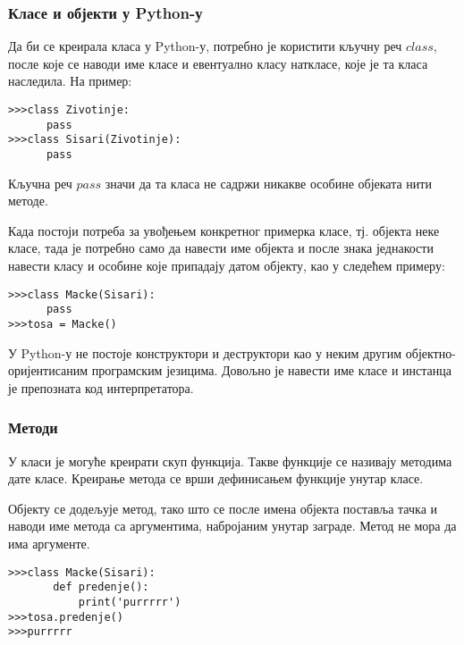 \subsubsection{Класе и објекти у Python-у}

Да би се креирала класа у Python-у, потребно је користити кључну реч $class$, после које се наводи име класе и евентуално класу наткласе, које је та класа наследила. На пример:

\begin{lstlisting}[caption=Дефинисање класа, label=class]
>>>class Zivotinje:
      pass
>>>class Sisari(Zivotinje):
      pass
\end{lstlisting}

Кључна реч $pass$ значи да та класа не садржи никакве особине објеката нити методе.

Када постоји потреба за увођењем конкретног примерка класе, тј. објекта неке класе, тада је потребно само да навести име објекта и после знака једнакости навести класу и особине које припадају датом објекту, као у следећем примеру:

\begin{lstlisting}[caption=Креирање објекта, label=objects]
>>>class Macke(Sisari):
      pass
>>>tosa = Macke()
\end{lstlisting}

У Python-у не постоје конструктори и деструктори као у неким другим објектно-оријентисаним програмским језицима. Довољно је навести име класе и инстанца је препозната код интерпретатора.

\subsubsection{Методи}

У класи је могуће креирати скуп функција. Такве функције се називају методима дате класе. Креирање метода се врши дефинисањем функције унутар класе.

Објекту се додељује метод, тако што се после имена објекта поставља тачка и наводи име метода са аргументима, набројаним унутар заграде. Метод не мора да има аргументе.

\begin{lstlisting}[caption= Методи класе, label=method]
>>>class Macke(Sisari):
       def predenje():
           print('purrrrr')
>>>tosa.predenje()
>>>purrrrr
\end{lstlisting}
